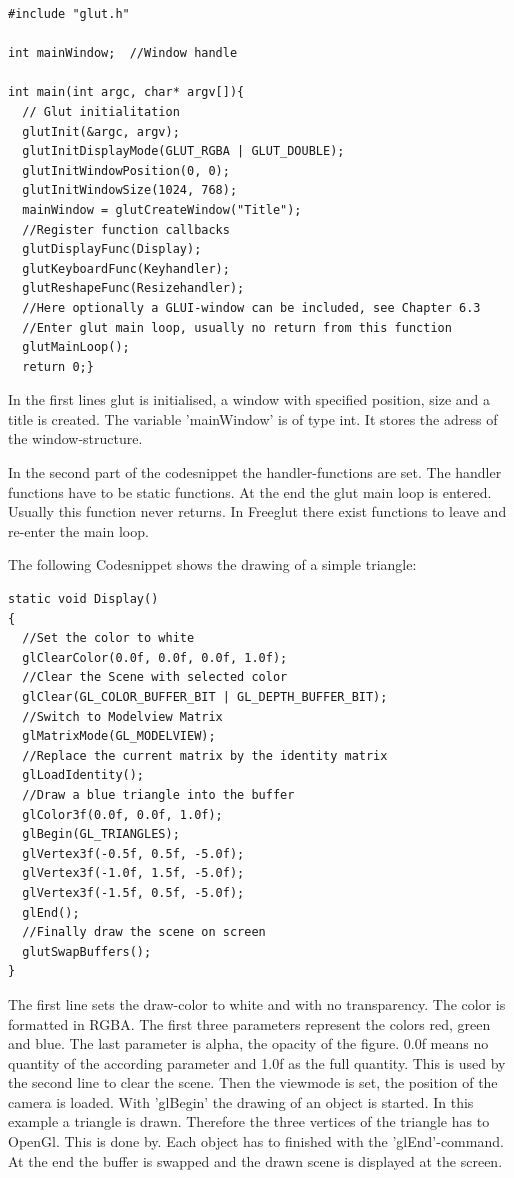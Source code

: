 \documentclass[10pt,a4paper,DIV=11]{scrreprt}
\begin{document}
\begin{lstlisting}[caption={Initialization of a GLUT program},label=lst:glut-init]
#include "glut.h"

int mainWindow;  //Window handle

int main(int argc, char* argv[]){
  // Glut initialitation
  glutInit(&argc, argv);
  glutInitDisplayMode(GLUT_RGBA | GLUT_DOUBLE);
  glutInitWindowPosition(0, 0); 
  glutInitWindowSize(1024, 768);
  mainWindow = glutCreateWindow("Title");
  //Register function callbacks
  glutDisplayFunc(Display);
  glutKeyboardFunc(Keyhandler);
  glutReshapeFunc(Resizehandler);
  //Here optionally a GLUI-window can be included, see Chapter 6.3
  //Enter glut main loop, usually no return from this function
  glutMainLoop(); 
  return 0;}
\end{lstlisting}

In the first lines glut is initialised, a window with specified position, size and a title is created.
The variable 'mainWindow' is of type int. It stores the adress of the window-structure.

In the second part of the codesnippet the handler-functions are set. The handler functions have to be static functions.
At the end the glut main loop is entered. Usually this function never returns. In Freeglut there exist functions to leave and re-enter the main loop.

The following Codesnippet shows the drawing of a simple triangle:

\begin{lstlisting}[caption={Drawing some graphics},label=lst:glut-draw]
static void Display()
{
  //Set the color to white
  glClearColor(0.0f, 0.0f, 0.0f, 1.0f);
  //Clear the Scene with selected color
  glClear(GL_COLOR_BUFFER_BIT | GL_DEPTH_BUFFER_BIT);
  //Switch to Modelview Matrix
  glMatrixMode(GL_MODELVIEW);
  //Replace the current matrix by the identity matrix
  glLoadIdentity();
  //Draw a blue triangle into the buffer
  glColor3f(0.0f, 0.0f, 1.0f);
  glBegin(GL_TRIANGLES);
  glVertex3f(-0.5f, 0.5f, -5.0f);
  glVertex3f(-1.0f, 1.5f, -5.0f);
  glVertex3f(-1.5f, 0.5f, -5.0f);
  glEnd();
  //Finally draw the scene on screen
  glutSwapBuffers();
}
\end{lstlisting}

The first line sets the draw-color to white and with no transparency. The color is formatted in RGBA. The first three parameters represent the colors red, green and blue. The last parameter is alpha, the opacity of the figure. 0.0f means no quantity of the according parameter and 1.0f as the full quantity.
 This is used by the second line to clear the scene.
Then the viewmode is set, the position of the camera is loaded.
With 'glBegin' the drawing of an object is started. In this example a triangle is drawn. Therefore the three vertices of the triangle has to OpenGl. This is done by. Each object has to finished with the 'glEnd'-command.
At the end the buffer is swapped and the drawn scene is displayed at the screen.
\end{document}
